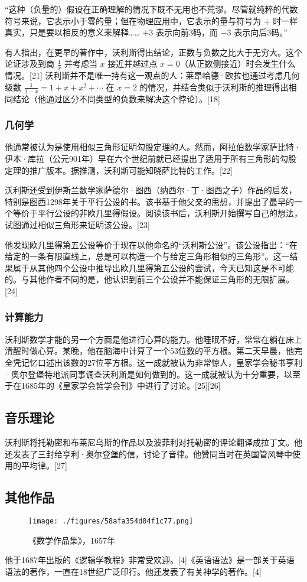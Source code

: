“这种（负量的）假设在正确理解的情况下既不无用也不荒谬。尽管就纯粹的代数符号来说，它表示小于零的量；但在物理应用中，它表示的量与符号为 \(+\) 时一样真实，只是要以相反的意义来解释…… \(+3\) 表示向前3码，而 \(-3\) 表示向后3码。”

有人指出，在更早的著作中，沃利斯得出结论，正数与负数之比大于无穷大。这个论证涉及到商 \(\frac{1}{x}\) 并考虑当 \(x\) 接近并越过点 \(x = 0\)（从正数侧接近）时会发生什么情况。[21] 沃利斯并不是唯一持有这一观点的人：莱昂哈德·欧拉也通过考虑几何级数 \(\frac{1}{1 - x} = 1 + x + x^2 + \cdots\) 在 \(x = 2\) 的情况，并结合类似于沃利斯的推理得出相同结论（他通过区分不同类型的负数来解决这个悖论）。[18]
\subsubsection{几何学}
他通常被认为是使用相似三角形证明勾股定理的人。然而，阿拉伯数学家萨比特·伊本·库拉（公元901年）早在六个世纪前就已经提出了适用于所有三角形的勾股定理的推广版本。据推测，沃利斯可能知晓萨比特的工作。[22]

沃利斯还受到伊斯兰数学家萨德尔·图西（纳西尔·丁·图西之子）作品的启发，特别是图西1298年关于平行公设的书。该书基于他父亲的思想，并提出了最早的一个等价于平行公设的非欧几里得假设。阅读该书后，沃利斯开始撰写自己的想法，试图通过相似三角形来证明该公设。[23]

他发现欧几里得第五公设等价于现在以他命名的“沃利斯公设”。该公设指出：“在给定的一条有限直线上，总是可以构造一个与给定三角形相似的三角形”。这一结果属于从其他四个公设中推导出欧几里得第五公设的尝试，今天已知这是不可能的。与其他作者不同的是，他认识到前三个公设并不能保证三角形的无限扩展。[24]
\subsubsection{计算能力}
沃利斯数学才能的另一个方面是他进行心算的能力。他睡眠不好，常常在躺在床上清醒时做心算。某晚，他在脑海中计算了一个53位数的平方根。第二天早晨，他完全凭记忆口述出该数的27位平方根。这一成就被认为非常惊人，皇家学会秘书亨利·奥尔登堡特地派同事调查沃利斯是如何做到的。这一成就被认为十分重要，以至于在1685年的《皇家学会哲学会刊》中进行了讨论。[25][26]
\subsection{音乐理论}
沃利斯将托勒密和布莱尼乌斯的作品以及波菲利对托勒密的评论翻译成拉丁文。他还发表了三封给亨利·奥尔登堡的信，讨论了音律。他赞同当时在英国管风琴中使用的平均律。[27]
\subsection{其他作品}
\begin{figure}[ht]
\centering
\texttt{[image: ./figures/58afa354d04f1c77.png]}
\caption{《数学作品集》，1657年} \label{fig_YHALS_5}
\end{figure}
他于1687年出版的《逻辑学教程》非常受欢迎。[4]《英语语法》是一部关于英语语法的著作，一直在18世纪广泛印行。他还发表了有关神学的著作。[4]

